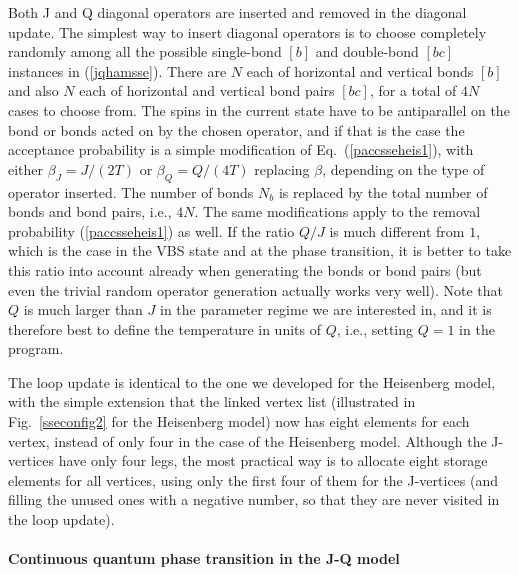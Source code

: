 \documentclass[draft,numberedheadings]{aipproc}
\begin{document}
Both J and Q diagonal operators are inserted and removed in the diagonal update. The simplest way to insert diagonal operators is to choose completely 
randomly among all the possible single-bond $[b]$ and double-bond $[bc]$ instances in (\ref{jqhamsse}). There are $N$ each of horizontal and vertical 
bonds $[b]$ and also $N$ each of horizontal and vertical bond pairs $[bc]$, for a total of $4N$ cases to choose from. The spins in the current state 
have to be antiparallel on the bond or bonds acted on by the chosen operator, and if that is the case the acceptance probability is a simple 
modification of Eq.~(\ref{paccsseheis1}), with either $\beta_J=J/(2T)$ or $\beta_Q=Q/(4T)$ replacing $\beta$, depending on the type of operator inserted. 
The number of bonds $N_b$ is replaced by the total number of bonds and bond pairs, i.e., $4N$. The same modifications apply to the removal probability 
(\ref{paccsseheis1}) as well. If the ratio $Q/J$ is much different from $1$, which is the case in the VBS state and at the phase transition, it is 
better to take this ratio into account already when generating the bonds or bond pairs (but even the trivial random operator generation actually 
works very well). Note that $Q$ is much larger than $J$ in the parameter regime we are interested in, and it is therefore best to define the 
temperature in units of $Q$, i.e., setting $Q=1$ in the program. 

The loop update is identical to the one we developed for the Heisenberg model, with the simple extension that the linked vertex list (illustrated 
in Fig.~\ref{sseconfig2} for the Heisenberg model) now has eight elements for each vertex, instead of only four in the case of the Heisenberg model. 
Although the J-vertices have only four legs, the most practical way is to allocate eight storage elements for all vertices, using only the first 
four of them for the J-vertices (and filling the unused ones with a negative number, so that they are never visited in the loop update).

\paragraph{Continuous quantum phase transition  in the  J-Q model}
\end{document}
